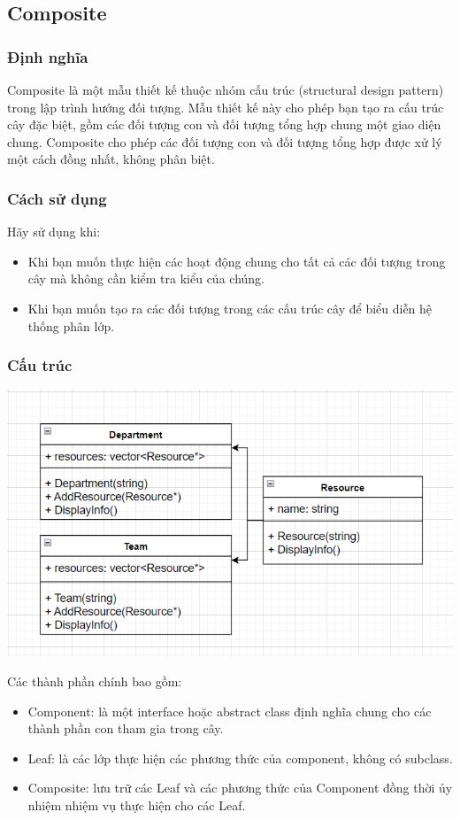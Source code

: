 \subsection{Composite}
\subsubsection{Định nghĩa}
Composite là một mẫu thiết kế thuộc nhóm cấu trúc (structural design pattern) trong lập trình hướng đối tượng. Mẫu thiết kế này cho phép bạn tạo ra cấu trúc cây đặc biệt, gồm các đối tượng con và đối tượng tổng hợp chung một giao diện chung. Composite cho phép các đối tượng con và đối tượng tổng hợp được xử lý một cách đồng nhất, không phân biệt.
\subsubsection{Cách sử dụng}
Hãy sử dụng khi:
\begin{itemize}
    \item Khi bạn muốn thực hiện các hoạt động chung cho tất cả các đối tượng trong cây mà không cần kiểm tra kiểu của chúng.
    \item Khi bạn muốn tạo ra các đối tượng trong các cấu trúc cây để biểu diễn hệ thống phân lớp.
\end{itemize}
\subsubsection{Cấu trúc}
\begin{center}
    \includegraphics[scale=0.7]{image/structural/composite.png}
\end{center}
Các thành phần chính bao gồm:
\begin{itemize}
    \item Component: là một interface hoặc abstract class định nghĩa chung cho các thành phần con tham gia trong cây.
    \item Leaf: là các lớp thực hiện các phương thức của component, không có subclass.
    \item Composite: lưu trữ các Leaf và các phương thức của Component đồng thời ủy nhiệm nhiệm vụ thực hiện cho các Leaf.
\end{itemize}

